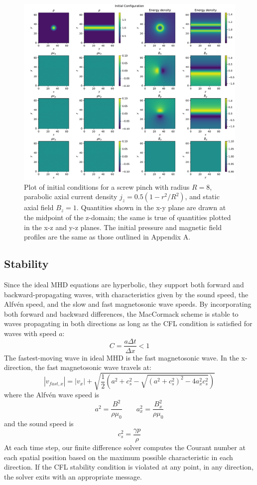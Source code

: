 \documentclass[%
 reprint,
 amsmath,amssymb,
 aps,
]{revtex4-2}
\begin{document}
\begin{figure}
\includegraphics[width=0.9\linewidth]{proj2-2/initial_configuration.pdf}
\caption{\label{fig:initial-conditions-plot}Plot of initial conditions for a screw pinch with radius $R=8$, parabolic axial current density $j_z = 0.5(1 - r^2/R^2)$, and static axial field $B_z = 1$. Quantities shown in the x-y plane are drawn at the midpoint of the z-domain; the same is true of quantities plotted in the x-z and y-z planes. The initial pressure and magnetic field profiles are the same as those outlined in Appendix A.}
\end{figure}

\subsection{Stability}
Since the ideal MHD equations are hyperbolic, they support both forward and backward-propagating waves, with characteristics given by the sound speed, the Alfvén speed, and the slow and fast magnetosonic wave speeds. By incorporating both forward and backward differences, the MacCormack scheme is stable to waves propagating in both directions as long as the CFL condition is satisfied for waves with speed $a$:
\begin{equation}
C = \frac{a \Delta t}{\Delta x} < 1
\end{equation}
The fastest-moving wave in ideal MHD is the fast magnetosonic wave. In the x-direction, the fast magnetosonic wave travels at:
\begin{equation}
|v_{fast, x}| = |v_x| + \sqrt{\frac{1}{2}\left(a^2 + c_s ^2 - \sqrt{(a^2 + c_s ^2)^2 - 4 a_x ^2 c_s ^2} \right) }
\end{equation}
where the Alfvén wave speed is
\begin{equation}
a^2 = \frac{B^2}{\rho \mu_0} \qquad a_x ^2 = \frac{B_x ^2}{\rho \mu_0}
\end{equation}
and the sound speed is
\begin{equation}
c_s ^2 = \frac{\gamma p}{\rho}
\end{equation}
At each time step, our finite difference solver computes the Courant number at each spatial position based on the maximum possible characteristic in each direction. If the CFL stability condition is violated at any point, in any direction, the solver exits with an appropriate message.
\end{document}
